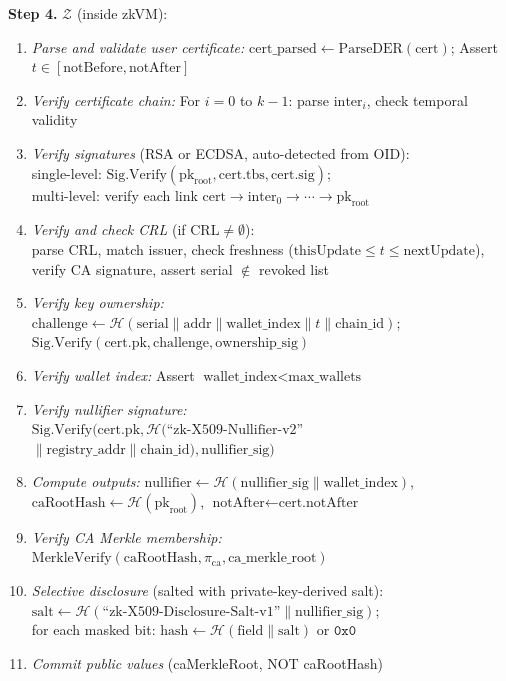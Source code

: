 \documentclass[11pt, a4paper]{article}
\begin{document}
\begin{mdframed}[linewidth=0.5pt, innertopmargin=8pt, innerbottommargin=8pt]
\medskip
\textbf{Step 4.} $\mathcal{Z}$ (inside zkVM):
\begin{enumerate}[nosep,leftmargin=1.5em]
\item \textit{Parse and validate user certificate:}
  $\text{cert\_parsed} \leftarrow \text{ParseDER}(\text{cert})$;
  Assert $t \in [\text{notBefore}, \text{notAfter}]$
\item \textit{Verify certificate chain:}
  For $i = 0$ to $k{-}1$: parse $\text{inter}_i$, check temporal validity
\item \textit{Verify signatures} (RSA or ECDSA, auto-detected from OID):\\
  single-level: $\text{Sig.Verify}(\text{pk}_{\text{root}}, \text{cert.tbs}, \text{cert.sig})$;\\
  multi-level: verify each link $\text{cert} \rightarrow \text{inter}_0 \rightarrow \cdots \rightarrow \text{pk}_{\text{root}}$
\item \textit{Verify and check CRL} (if $\text{CRL} \neq \emptyset$):\\
  parse CRL, match issuer, check freshness ($\text{thisUpdate} \leq t \leq \text{nextUpdate}$),\\
  verify CA signature, assert serial $\notin$ revoked list
\item \textit{Verify key ownership:}\\
  $\text{challenge} \leftarrow \mathcal{H}(\text{serial} \| \text{addr} \| \text{wallet\_index} \| t \| \text{chain\_id})$;\\
  $\text{Sig.Verify}(\text{cert.pk}, \text{challenge}, \text{ownership\_sig})$
\item \textit{Verify wallet index:} Assert $\text{wallet\_index} < \text{max\_wallets}$
\item \textit{Verify nullifier signature:}\\
  $\text{Sig.Verify}(\text{cert.pk}, \mathcal{H}(\text{``zk-X509-Nullifier-v2''}$\\
  $\| \text{registry\_addr} \| \text{chain\_id}), \text{nullifier\_sig})$
\item \textit{Compute outputs:}
  $\text{nullifier} \leftarrow \mathcal{H}(\text{nullifier\_sig} \| \text{wallet\_index})$,
  $\text{caRootHash} \leftarrow \mathcal{H}(\text{pk}_{\text{root}})$,
  $\text{notAfter} \leftarrow \text{cert.notAfter}$
\item \textit{Verify CA Merkle membership:}
  $\text{MerkleVerify}(\text{caRootHash}, \pi_{\text{ca}}, \text{ca\_merkle\_root})$
\item \textit{Selective disclosure} (salted with private-key-derived salt):\\
  $\text{salt} \leftarrow \mathcal{H}(\text{``zk-X509-Disclosure-Salt-v1''} \| \text{nullifier\_sig})$;\\
  for each masked bit: $\text{hash} \leftarrow \mathcal{H}(\text{field} \| \text{salt})$ or $\texttt{0x0}$
\item \textit{Commit public values} (caMerkleRoot, NOT caRootHash)
\end{enumerate}


\end{mdframed}
\end{document}
